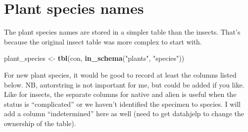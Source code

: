 \documentclass[]{article}
\newenvironment{Shaded}{\begin{snugshade}}{\end{snugshade}}
\newcommand{\DataTypeTok}[1]{\textcolor[rgb]{0.13,0.29,0.53}{#1}}
\newcommand{\DecValTok}[1]{\textcolor[rgb]{0.00,0.00,0.81}{#1}}
\newcommand{\KeywordTok}[1]{\textcolor[rgb]{0.13,0.29,0.53}{\textbf{#1}}}
\newcommand{\NormalTok}[1]{#1}
\newcommand{\OperatorTok}[1]{\textcolor[rgb]{0.81,0.36,0.00}{\textbf{#1}}}
\newcommand{\StringTok}[1]{\textcolor[rgb]{0.31,0.60,0.02}{#1}}
\begin{document}
\begin{Shaded}
\end{Shaded}

\hypertarget{plant-species-names}{%
\section{Plant species names}\label{plant-species-names}}

The plant species names are stored in a simpler table than the insects.
That's because the original insect table was more complex to start with.

\begin{Shaded}
\begin{Highlighting}[]
\NormalTok{plant_species <-}\StringTok{ }\KeywordTok{tbl}\NormalTok{(con, }\KeywordTok{in_schema}\NormalTok{(}\StringTok{"plants"}\NormalTok{, }\StringTok{"species"}\NormalTok{)) }
\end{Highlighting}
\end{Shaded}

For new plant species, it would be good to record at least the columns
listed below. NB, autorstring is not important for me, but could be
added if you like. Like for insects, the separate columns for native and
alien is useful when the status is ``complicated'' or we haven't
identified the specimen to species. I will add a column ``indetermined''
here as well (need to get datahjelp to change the ownership of the
table).

\begin{Shaded}
\end{Shaded}
\end{document}
